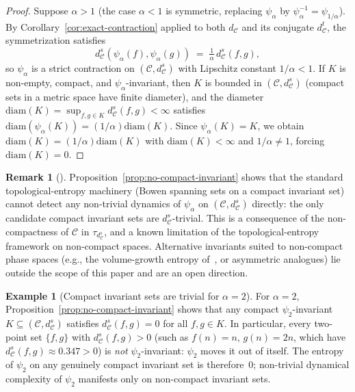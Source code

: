 \documentclass[11pt,a4paper]{article}
\theoremstyle{plain}
\theoremstyle{definition}
\newtheorem{exampleinner}[theoreminner]{Example}
\newtheorem{remarkinner}[theoreminner]{Remark}
\newenvironment{example}[1][]{\begin{exampleinner}[#1]}{\end{exampleinner}}
\newenvironment{remark}[1][]{\begin{remarkinner}[#1]}{\end{remarkinner}}
\newcommand{\C}{\mathcal{C}}
\begin{document}
\begin{proof}
Suppose $\alpha>1$ (the case $\alpha<1$ is symmetric, replacing
$\psi_\alpha$ by $\psi_\alpha^{-1}=\psi_{1/\alpha}$).  By
Corollary~\ref{cor:exact-contraction} applied to both $d_\C$ and
its conjugate $d_\C^t$, the symmetrization satisfies
\[
  d_\C^s(\psi_\alpha(f),\psi_\alpha(g))
  \;=\;\tfrac{1}{\alpha}\,d_\C^s(f,g),
\]
so $\psi_\alpha$ is a strict contraction on $(\C,d_\C^s)$ with
Lipschitz constant $1/\alpha<1$.  If $K$ is non-empty, compact, and
$\psi_\alpha$-invariant, then $K$ is bounded in $(\C,d_\C^s)$
(compact sets in a metric space have finite diameter), and the
diameter $\mathrm{diam}(K)=\sup_{f,g\in K}d_\C^s(f,g)<\infty$
satisfies $\mathrm{diam}(\psi_\alpha(K))=(1/\alpha)\mathrm{diam}(K)$.
Since $\psi_\alpha(K)=K$, we obtain
$\mathrm{diam}(K)=(1/\alpha)\mathrm{diam}(K)$ with
$\mathrm{diam}(K)<\infty$ and $1/\alpha\ne 1$, forcing
$\mathrm{diam}(K)=0$.
\end{proof}

\begin{remark}\label{rem:entropy-vacuous}
Proposition~\ref{prop:no-compact-invariant} shows that the standard
topological-entropy machinery (Bowen spanning sets on a compact
invariant set) cannot detect any non-trivial dynamics of
$\psi_\alpha$ on $(\C,d_\C^s)$ directly: the only candidate compact
invariant sets are $d_\C^s$-trivial.  This is a consequence of the
non-compactness of $\C$ in $\tau_{d_\C^s}$, and a known limitation
of the topological-entropy framework on non-compact spaces.
Alternative invariants suited to non-compact phase spaces (e.g.,
the volume-growth entropy of~\cite{walters1982}, or asymmetric
analogues) lie outside the scope of this paper and are an open
direction.
\end{remark}

\begin{example}[Compact invariant sets are trivial for $\alpha=2$]\label{ex:entropy-alpha2}
For $\alpha=2$, Proposition~\ref{prop:no-compact-invariant} shows
that any compact $\psi_2$-invariant $K\subseteq(\C,d_\C^s)$
satisfies $d_\C^s(f,g)=0$ for all $f,g\in K$.  In particular,
every two-point set $\{f,g\}$ with $d_\C^s(f,g)>0$ (such as
$f(n)=n$, $g(n)=2n$, which have $d_\C^s(f,g)\approx 0.347>0$) is
\emph{not} $\psi_2$-invariant: $\psi_2$ moves it out of itself.
The entropy of $\psi_2$ on any genuinely compact invariant set is
therefore~$0$; non-trivial dynamical complexity of $\psi_2$
manifests only on non-compact invariant sets.
\end{example}
\end{document}
